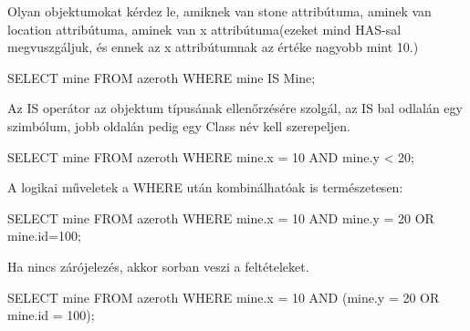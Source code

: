 Olyan objektumokat kérdez le, amiknek van stone attribútuma, aminek van location attribútuma, aminek van x attribútuma(ezeket mind HAS-sal megvuszgáljuk, és ennek az x attribútumnak az értéke nagyobb mint 10.)
\begin{sql}
SELECT mine FROM azeroth WHERE mine IS Mine;
\end{sql}
Az IS operátor az objektum típusának ellenőrzésére szolgál, az IS bal odlalán egy szimbólum, jobb oldalán pedig egy Class név kell szerepeljen.
\begin{sql}
SELECT mine FROM azeroth WHERE mine.x = 10 AND mine.y < 20;
\end{sql}

A logikai műveletek a WHERE után kombinálhatóak is természetesen:
\begin{sql}
SELECT mine FROM azeroth WHERE mine.x = 10 AND mine.y = 20 OR mine.id=100;
\end{sql}
Ha nincs zárójelezés, akkor sorban veszi a feltételeket.
\begin{sql}
SELECT mine FROM azeroth WHERE mine.x = 10 AND (mine.y = 20 OR mine.id = 100);
\end{sql}

